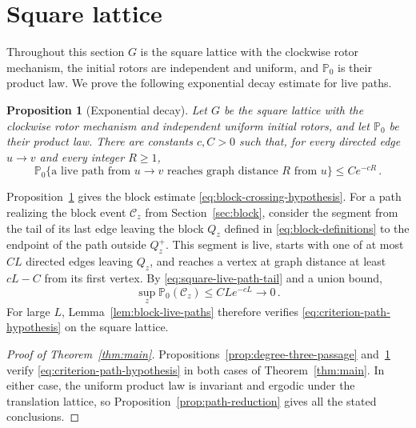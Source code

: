 \documentclass[11pt]{amsart}
\theoremstyle{plain}
\newtheorem{proposition}[theorem]{Proposition}
\theoremstyle{definition}
\renewcommand{\P}{\mathbb P}
\begin{document}
	
	\section{Square lattice}\label{sec:square}
	
	Throughout this section $G$ is the square lattice with the clockwise rotor
	mechanism, the initial rotors are independent and uniform, and $\P_0$ is their
	product law.  We prove the following exponential decay estimate for live paths. 
	
	\begin{proposition}[Exponential decay]
		\label{prop:square-passage}
		Let $G$ be the square lattice with the clockwise rotor mechanism and
		independent uniform initial rotors, and let $\P_0$ be their product law.
		There are constants $c,C>0$ such that, for every directed edge $u\to v$ and
		every integer $R\geq1$,
		\begin{equation}\label{eq:square-live-path-tail}
			\P_0\{\text{a live path from $u\to v$ reaches graph distance $R$ from $u$}\}
			\leq Ce^{-cR}\, .
		\end{equation}
	\end{proposition}
	
	Proposition~\ref{prop:square-passage} gives the block estimate
	\eqref{eq:block-crossing-hypothesis}.  For a path realizing the block event
	$\mathcal C_z$ from
	Section~\ref{sec:block}, consider the segment from the tail of its last edge
	leaving the block $Q_z$ defined in \eqref{eq:block-definitions} to the endpoint
	of the path outside $Q_z^+$.  This segment is live, starts with one of at most
	$CL$ directed edges leaving $Q_z$, and reaches a vertex at graph distance at
	least $cL-C$ from its first vertex.
	By \eqref{eq:square-live-path-tail} and a union bound,
	\[
	\sup_z\P_0(\mathcal C_z)
	\leq CLe^{-cL}
	\longrightarrow0\, .
	\]
	For large $L$, Lemma~\ref{lem:block-live-paths} therefore verifies
	\eqref{eq:criterion-path-hypothesis} on the square lattice.
	
	\begin{proof}[Proof of Theorem~\ref{thm:main}]
		Propositions~\ref{prop:degree-three-passage} and~\ref{prop:square-passage}
		verify \eqref{eq:criterion-path-hypothesis} in both cases of
		Theorem~\ref{thm:main}.  In either case, the uniform product law is invariant
		and ergodic under the translation lattice, so
		Proposition~\ref{prop:path-reduction} gives all the stated conclusions.
	\end{proof}
	
\end{document}
